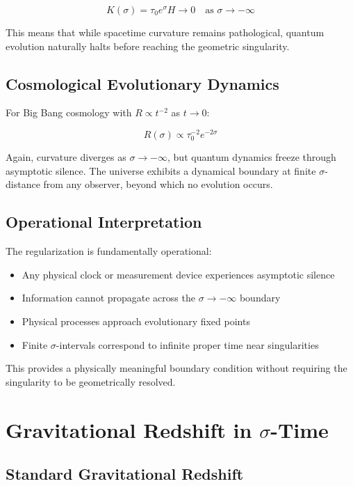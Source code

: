 \documentclass[12pt,a4paper]{article}
\begin{document}
\begin{equation}
K(\sigma) = \tau_0 e^{\sigma} H \to 0 \quad \text{as } \sigma \to -\infty
\end{equation}

This means that while spacetime curvature remains pathological, quantum evolution naturally halts before reaching the geometric singularity.

\subsection{Cosmological Evolutionary Dynamics}

For Big Bang cosmology with $R \propto t^{-2}$ as $t \to 0$:

\begin{equation}
R(\sigma) \propto \tau_0^{-2} e^{-2\sigma}
\end{equation}

Again, curvature diverges as $\sigma \to -\infty$, but quantum dynamics freeze through asymptotic silence. The universe exhibits a dynamical boundary at finite $\sigma$-distance from any observer, beyond which no evolution occurs.

\subsection{Operational Interpretation}

The regularization is fundamentally operational: 
\begin{itemize}
\item Any physical clock or measurement device experiences asymptotic silence
\item Information cannot propagate across the $\sigma \to -\infty$ boundary
\item Physical processes approach evolutionary fixed points
\item Finite $\sigma$-intervals correspond to infinite proper time near singularities
\end{itemize}

This provides a physically meaningful boundary condition without requiring the singularity to be geometrically resolved.

\section{Gravitational Redshift in $\sigma$-Time}

\subsection{Standard Gravitational Redshift}
\end{document}
